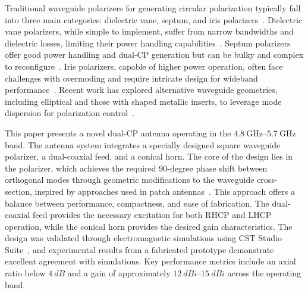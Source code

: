 \documentclass[journal]{IEEEtran}
\newcommand{\frequencyrange}{\qtyrange{4.8}{5.7}{\giga\hertz}}
\begin{document}
Traditional waveguide polarizers for generating circular polarization typically fall into three main categories: dielectric vane, septum, and iris polarizers~\cite{cite3, cite4, cite5}. Dielectric vane polarizers, while simple to implement, suffer from narrow bandwidths and dielectric losses, limiting their power handling capabilities~\cite{cite6}. Septum polarizers offer good power handling and dual-CP generation but can be bulky and complex to reconfigure~\cite{ruiz-cruz-et-al:compact-reconfigurable-waveguide-circular-polarizer, wang-et-al:novel-square-rectangle-waveguide-septum-polarizer}. Iris polarizers, capable of higher power operation, often face challenges with overmoding and require intricate design for wideband performance~\cite{song-et-al:design-of-wideband-quad-ridge-waveguide-polarizer, virone-et-al:optimum-iris-set-concept-for-waveguide-polarizers, piltyay-et-al:new-tunable-iris-post-square-waveguide-polarizers-for-satelliste-information-systems}. Recent work has explored alternative waveguide geometries, including elliptical and those with shaped metallic inserts, to leverage mode dispersion for polarization control~\cite{yu-et-al:a-wideband-circularly-polarized-horn-antenna-with-a-tapered-elliptical-waveguide-polarizer, rud-shpachenko:polarizers-on-sections-of-square-waveguides-with-inner-corner-ridges, bhardwaj-volakis:hexagonal-waveguides-new-class-of-waveguides-for-mmwave-circularly-polarized-horns, bhardwaj-volakis:hexagonal-waveguide-based-circularly-polarized-horn-antennas-for-submmwave-terahertz-band, bhardwaj-volakis:circularly-polarized-horn-antennas-for-terahertz-communications-using-differential-mode-dispersion-in-hexagonal-waveguides, garcia-marin-masa-campos:bowtie-shaped-radiating-element-for-single-and-dual-circular-polarization}.

This paper presents a novel dual-CP antenna operating in the $\frequencyrange$ band. The antenna system integrates a specially designed square waveguide polarizer, a dual-coaxial feed, and a conical horn. The core of the design lies in the polarizer, which achieves the required 90-degree phase shift between orthogonal modes through geometric modifications to the waveguide cross-section, inspired by approaches used in patch antennas~\cite{cite_patch_antenna}. This approach offers a balance between performance, compactness, and ease of fabrication. The dual-coaxial feed provides the necessary excitation for both RHCP and LHCP operation, while the conical horn provides the desired gain characteristics. The design was validated through electromagnetic simulations using CST Studio Suite~\cite{cst}, and experimental results from a fabricated prototype demonstrate excellent agreement with simulations. Key performance metrics include an axial ratio below $\qty{4}{dB}$ and a gain of approximately $\qtyrange{12}{15}{dBi}$ across the operating band.
\end{document}
